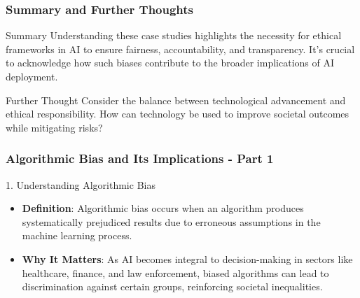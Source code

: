 \documentclass{beamer}
\begin{document}
\begin{frame}[fragile]
    \frametitle{Summary and Further Thoughts}
    \begin{block}{Summary}
        Understanding these case studies highlights the necessity for ethical frameworks in AI to ensure fairness, accountability, and transparency. 
        It's crucial to acknowledge how such biases contribute to the broader implications of AI deployment.
    \end{block}

    \begin{block}{Further Thought}
        Consider the balance between technological advancement and ethical responsibility. 
        How can technology be used to improve societal outcomes while mitigating risks?
    \end{block}
\end{frame}

\begin{frame}[fragile]
    \frametitle{Algorithmic Bias and Its Implications - Part 1}
    \begin{block}{1. Understanding Algorithmic Bias}
        \begin{itemize}
            \item \textbf{Definition}: Algorithmic bias occurs when an algorithm produces systematically prejudiced results due to erroneous assumptions in the machine learning process.
            \item \textbf{Why It Matters}: As AI becomes integral to decision-making in sectors like healthcare, finance, and law enforcement, biased algorithms can lead to discrimination against certain groups, reinforcing societal inequalities.
        \end{itemize}
    \end{block}
\end{frame}
\end{document}

